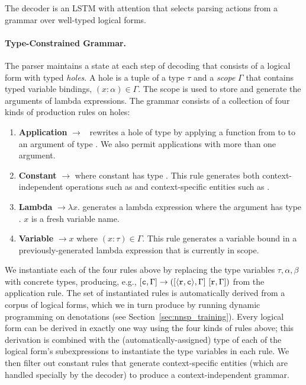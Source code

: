 The decoder is an LSTM with attention that selects parsing actions from a 
grammar over well-typed logical forms.

\paragraph{Type-Constrained Grammar.} The parser maintains a state at each step 
of decoding that consists of a logical form with typed \emph{holes}.
A hole is a tuple \hole{\tau}{\Gamma} of a type $\tau$ and a \emph{scope} 
$\Gamma$ that contains typed variable bindings, $(x:\alpha) \in \Gamma$.
The scope is used to store and generate the arguments of lambda expressions. 
The grammar consists of a collection of four kinds of production rules on holes:

\begin{enumerate}
    \item \textbf{Application} 
\hole{\tau}{\Gamma}$\rightarrow$\pred{(}\hole{\func{\beta}{\tau}}{\Gamma}~\hole{\beta}{\Gamma}\pred{)}
rewrites a hole of type \type{\tau} by applying a 
function from \type{\beta} to \type{\tau} to an argument of type \type{\beta}. 
We also permit applications with more than one argument.
    \item \textbf{Constant} \hole{\tau}{\Gamma}$\rightarrow$ where 
constant  has type \type{\tau}. This rule generates both 
context-independent operations such as  and context-specific 
entities such as .
    \item \textbf{Lambda} \hole{\func{\alpha}{\tau}}{\Gamma}$\rightarrow 
\lambda x$.  generates a lambda 
expression where the argument has type \type{\alpha}. $x$ is a fresh variable 
name.
    \item \textbf{Variable} \hole{\tau}{\Gamma}$\rightarrow x$ where $(x : 
\tau) \in \Gamma$. This rule generates a variable bound in a 
previously-generated lambda expression that is currently in scope.
\end{enumerate}

We instantiate each of the four rules above by replacing the type variables 
$\tau, \alpha,\beta$ with concrete types, producing, e.g., $[\mathtt{c},\Gamma] 
\rightarrow ([\mathtt{\langle \mathtt{r},\mathtt{c} \rangle},\Gamma]~[\mathtt{r},\Gamma])$ from the application 
rule.
The set of instantiated rules is automatically derived from a corpus of logical 
forms, which we in turn produce by running dynamic programming on denotations 
(see Section~\ref{sec:nnsp_training}).
Every logical form can be derived in exactly one way using the four kinds of 
rules above; this derivation is combined with the (automatically-assigned) type 
of each of the logical form's subexpressions to instantiate the type variables 
in each rule.
We then filter out constant rules that generate context-specific entities 
(which are 
handled specially by the decoder) to produce a 
context-independent grammar.

